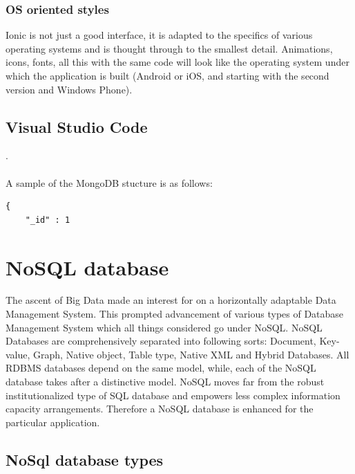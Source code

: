 \subsubsection{OS oriented styles}
Ionic is not just a good interface, it is adapted to the specifics of various operating systems and is thought through to the smallest detail. Animations, icons, fonts, all this with the same code will look like the operating system under which the application is built (Android or iOS, and starting with the second version and Windows Phone).\cite{IonicOS}

\subsection{Visual Studio Code}
\cite{mLab}.\\
\\
A sample of the MongoDB stucture is as follows\cite{WilliamZola}:
\begin{verbatim}
{
    "_id" : 1

\end{verbatim}

\section{NoSQL database}
The ascent of Big Data made an interest for on a horizontally adaptable Data Management System. This prompted advancement of various types of Database Management System which all things considered go under NoSQL. NoSQL Databases are comprehensively separated into following sorts: Document, Key-value, Graph, Native object, Table type, Native XML and Hybrid Databases. All RDBMS databases depend on the same model, while, each of the NoSQL database takes after a distinctive model. NoSQL moves far from the robust institutionalized type of SQL database and empowers less complex information capacity arrangements. Therefore a NoSQL database is enhanced for the particular application.\cite{noSql}

\subsection{NoSql database types}

